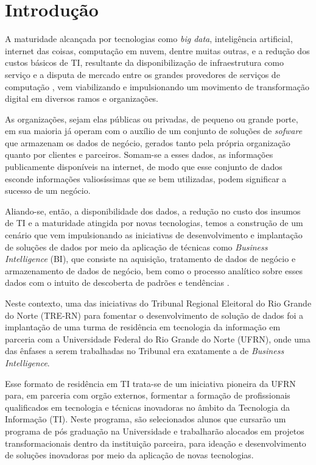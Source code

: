 
\section{Introdução}
A maturidade alcançada por tecnologias como \textit{big data}, inteligência artificial, internet das coisas, computação em nuvem, dentre muitas outras, e a redução dos custos básicos de TI, resultante da disponibilização de infraestrutura como serviço e a disputa de mercado entre os grandes provedores de serviços de computação \cite{infraPriceDrop}, vem viabilizando e impulsionando um movimento de transformação digital em diversos ramos e organizações.

As organizações, sejam elas públicas ou privadas, de pequeno ou grande porte, em sua maioria já operam com o auxílio de um conjunto de soluções de \textit{sofware} que armazenam os dados de negócio, gerados tanto pela própria organização quanto por clientes e parceiros. Somam-se a esses dados, as informações publicamente disponíveis na internet, de modo que esse conjunto de dados esconde informações valiosíssimas que se bem utilizadas, podem significar a sucesso de um negócio. 

Aliando-se, então, a disponibilidade dos dados, a redução no custo dos insumos de TI e a maturidade atingida por novas tecnologias, temos a construção de um cenário que vem impulsionando as iniciativas de desenvolvimento e implantação de soluções de dados por meio da aplicação de técnicas como \textit{Business Intelligence} (BI), que consiste na aquisição, tratamento de dados de negócio e armazenamento de dados de negócio, bem como o processo analítico sobre esses dados com o intuito de descoberta de padrões e tendências \cite{BIDef}.

Neste contexto, uma das iniciativas do Tribunal Regional Eleitoral do Rio Grande do Norte (TRE-RN) para fomentar o desenvolvimento de solução de dados foi a implantação de uma turma de residência em tecnologia da informação em parceria com a Universidade Federal do Rio Grande do Norte (UFRN), onde uma das ênfases a serem trabalhadas no Tribunal era exatamente a de \textit{Business Intelligence}. 

Esse formato de residência em TI trata-se de um iniciativa pioneira da UFRN para, em parceria com orgão externos, formentar a formação de profissionais qualificados em tecnologia e técnicas inovadoras no âmbito da Tecnologia da Informação (TI). Neste programa, são selecionados alunos que cursarão um programa de pós graduação na Universidade e trabalharão alocados em projetos transformacionais dentro da instituição parceira, para ideação e desenvolvimento de soluções inovadoras por meio da aplicação de novas tecnologias.

